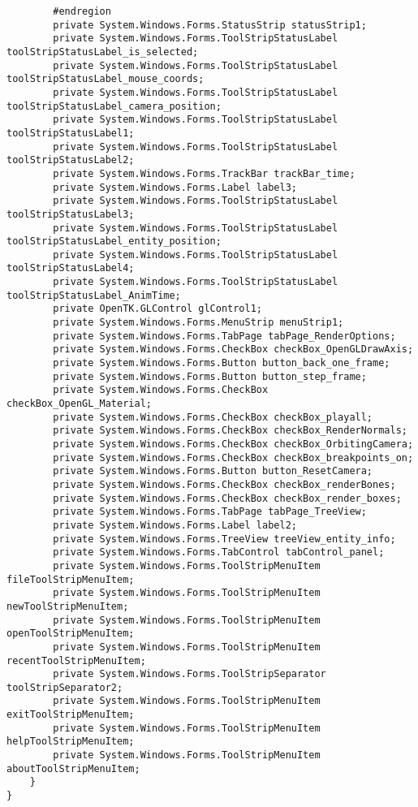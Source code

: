 \begin{scriptsize}
\begin{verbatim}
        #endregion
        private System.Windows.Forms.StatusStrip statusStrip1;
        private System.Windows.Forms.ToolStripStatusLabel toolStripStatusLabel_is_selected;
        private System.Windows.Forms.ToolStripStatusLabel toolStripStatusLabel_mouse_coords;
        private System.Windows.Forms.ToolStripStatusLabel toolStripStatusLabel_camera_position;
        private System.Windows.Forms.ToolStripStatusLabel toolStripStatusLabel1;
        private System.Windows.Forms.ToolStripStatusLabel toolStripStatusLabel2;
        private System.Windows.Forms.TrackBar trackBar_time;
        private System.Windows.Forms.Label label3;
        private System.Windows.Forms.ToolStripStatusLabel toolStripStatusLabel3;
        private System.Windows.Forms.ToolStripStatusLabel toolStripStatusLabel_entity_position;
        private System.Windows.Forms.ToolStripStatusLabel toolStripStatusLabel4;
        private System.Windows.Forms.ToolStripStatusLabel toolStripStatusLabel_AnimTime;
        private OpenTK.GLControl glControl1;
        private System.Windows.Forms.MenuStrip menuStrip1;
        private System.Windows.Forms.TabPage tabPage_RenderOptions;
        private System.Windows.Forms.CheckBox checkBox_OpenGLDrawAxis;
        private System.Windows.Forms.Button button_back_one_frame;
        private System.Windows.Forms.Button button_step_frame;
        private System.Windows.Forms.CheckBox checkBox_OpenGL_Material;
        private System.Windows.Forms.CheckBox checkBox_playall;
        private System.Windows.Forms.CheckBox checkBox_RenderNormals;
        private System.Windows.Forms.CheckBox checkBox_OrbitingCamera;
        private System.Windows.Forms.CheckBox checkBox_breakpoints_on;
        private System.Windows.Forms.Button button_ResetCamera;
        private System.Windows.Forms.CheckBox checkBox_renderBones;
        private System.Windows.Forms.CheckBox checkBox_render_boxes;
        private System.Windows.Forms.TabPage tabPage_TreeView;
        private System.Windows.Forms.Label label2;
        private System.Windows.Forms.TreeView treeView_entity_info;
        private System.Windows.Forms.TabControl tabControl_panel;
        private System.Windows.Forms.ToolStripMenuItem fileToolStripMenuItem;
        private System.Windows.Forms.ToolStripMenuItem newToolStripMenuItem;
        private System.Windows.Forms.ToolStripMenuItem openToolStripMenuItem;
        private System.Windows.Forms.ToolStripMenuItem recentToolStripMenuItem;
        private System.Windows.Forms.ToolStripSeparator toolStripSeparator2;
        private System.Windows.Forms.ToolStripMenuItem exitToolStripMenuItem;
        private System.Windows.Forms.ToolStripMenuItem helpToolStripMenuItem;
        private System.Windows.Forms.ToolStripMenuItem aboutToolStripMenuItem;
    }
}



\end{verbatim}
\end{scriptsize}
